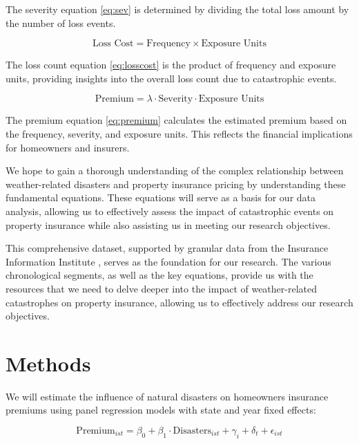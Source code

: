\documentclass[12pt]{article}
\begin{document}
The severity equation \ref{eq:sev} is determined by dividing the total loss amount by the number of loss events.

\begin{equation}
    \label{eq:losscost}
    \text{Loss Cost} = \text{Frequency} \times \text{Exposure Units}
\end{equation}

The loss count equation \ref{eq:losscost} is the product of frequency and exposure units, providing insights into the overall loss count due to catastrophic events.

\begin{equation}
    \label{eq:premium}
    \text{Premium} = \lambda \cdot \text{Severity} \cdot \text{Exposure Units}
\end{equation}

The premium equation \ref{eq:premium} calculates the estimated premium based on the frequency, severity, and exposure units. This 
reflects the financial implications for homeowners and insurers.

We hope to gain a thorough understanding of the complex relationship between weather-related disasters and property insurance pricing 
by understanding these fundamental equations. These equations will serve as a basis for our data analysis, allowing us to effectively 
assess the impact of catastrophic events on property insurance while also assisting us in meeting our research objectives.

This comprehensive dataset, supported by granular data from the Insurance Information Institute \cite{iii}, serves as the foundation 
for our research. The various chronological segments, as well as the key equations, provide us with the resources that we need to 
delve deeper into the impact of weather-related catastrophes on property insurance, allowing us to effectively address our research 
objectives. 



\section{Methods}
\label{sec:meth}
We will estimate the influence of natural disasters on homeowners insurance premiums using panel regression models with state and year 
fixed effects:

\begin{equation} 
    \mathrm{Premium}_{ist} = \beta_0 + \beta_1 \cdot \mathrm{Disasters}_{ist} + \gamma_i + \delta_t + \epsilon_{ist}
\end{equation}
\end{document}
